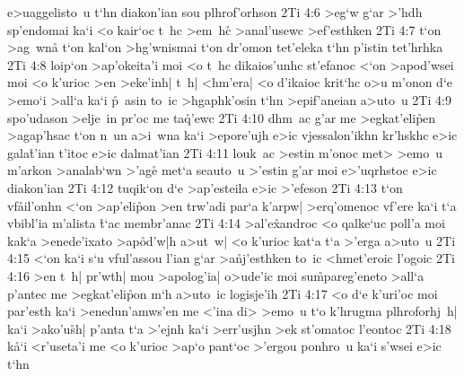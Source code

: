 e>uaggelisto~u
t`hn
diakon'ian
sou
plhrof'orhson\bibvsend
\vs 2Ti 4:6
>eg`w
g`ar
>'hdh
sp'endomai
ka`i
<o
kair`oc
t~hc
>em~hc\r{}
>anal'usewc
>ef'esthken\bibvsend
\vs 2Ti 4:7
t`on
>ag~wna\r{}
t`on
kal`on
>hg'wnismai
t`on
dr'omon
tet'eleka
t`hn
p'istin
tet'hrhka\bibvsend
\vs 2Ti 4:8
loip`on
>ap'okeita'i
moi
<o
t~hc
dikaios'unhc
st'efanoc
<`on
>apod'wsei
moi
<o
k'urioc
>en
>eke'inh|
t~h|
<hm'era|
<o
d'ikaioc
krit`hc
o>u
m'onon
d`e
>emo`i
>all`a
ka`i
\r{p}~asin
to~ic
>hgaphk'osin
t`hn
>epif'aneian
a>uto~u\bibvsend
\vs 2Ti 4:9
spo'udason
>elje~in
pr'oc
me
ta\r{q}'ewc\bibvsend
{}
\vs 2Ti 4:10
dhm~ac
g'ar
me
>egkat'eli\r{p}en
>agap'hsac
t`on
n~un
a>i~wna
ka`i
>epore'ujh
e>ic
vjessalon'ikhn
kr'hskhc
e>ic
gala\r{t}'ian
t'itoc
e>ic
dalmat'ian\bibvsend
\vs 2Ti 4:11
louk~ac
>estin
m'onoc
met>
>emo~u
m'arkon
>analab`wn
>'ag\r{e}
met`a
seauto~u
>'estin
g'ar
moi
e>'uqrhstoc
e>ic
diakon'ian\bibvsend
\vs 2Ti 4:12
tuqik`on
d`e
>ap'esteila
e>ic
>'efeson\bibvsend
\vs 2Ti 4:13
t`on
vf\r{a}il'onhn
<`on
>ap'eli\r{p}on
>en
trw'adi
par`a
k'arpw|
>erq'omenoc
vf'ere
ka`i
t`a
vbibl'ia
m'alista
\r{t}`ac
membr'anac\bibvsend
\vs 2Ti 4:14
>al'e\r{x}androc
<o
qalke`uc
poll'a
moi
kak`a
>enede'ixato
>ap\r{o}d'w|h
a>ut~w|
<o
k'urioc
kat`a
t`a
>'erga
a>uto~u\bibvsend
\vs 2Ti 4:15
<`on
ka`i
s`u
vful'assou
l'ian
g`ar
>a\r{n}j'esthken
to~ic
<hmet'eroic
l'ogoic\bibvsend
\vs 2Ti 4:16
>en
t~h|
pr'wth|
mou
>apolog'ia|
o>ude'ic
moi
su\r{m}pareg'eneto
>all`a
p'antec
me
>egkat'eli\r{p}on
m`h
a>uto~ic
logisje'ih\bibvsend
\vs 2Ti 4:17
<o
d`e
k'uri'oc
moi
par'esth
ka`i
>enedun'amws'en
me
<'ina
di>
>emo~u
t`o
k'hrugma
plhroforhj~h|
ka`i
>ako'u\r{s}h|
p'anta
t`a
>'ejnh
ka`i
>err'usjhn
>ek
st'omatoc
l'eontoc\bibvsend
\vs 2Ti 4:18
k\r{a}`i
<r'useta'i
me
<o
k'urioc
>ap`o
pant`oc
>'ergou
ponhro~u
ka`i
s'wsei
e>ic
t`hn

